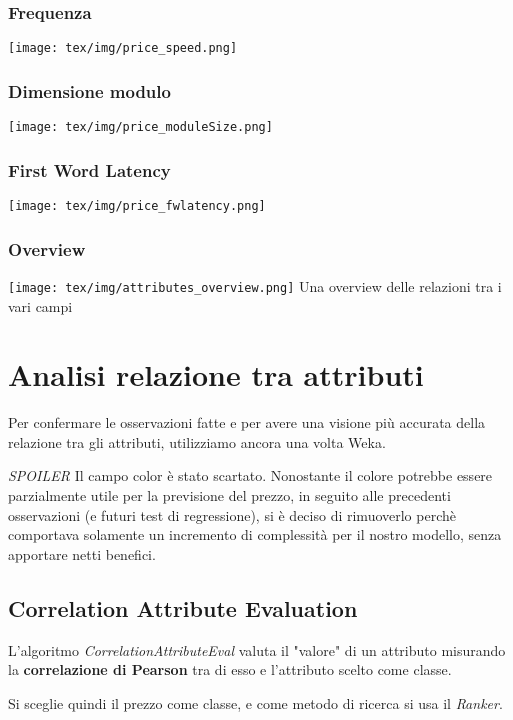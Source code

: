 \documentclass[12pt]{report}
\begin{document}
\subsubsection{Frequenza}
\texttt{[image: tex/img/price\_speed.png]}
\subsubsection{Dimensione modulo}
\texttt{[image: tex/img/price\_moduleSize.png]}
\subsubsection{First Word Latency}
\texttt{[image: tex/img/price\_fwlatency.png]}
\subsubsection{Overview}
\texttt{[image: tex/img/attributes\_overview.png]}
Una overview delle relazioni tra i vari campi


\newpage
\section{Analisi relazione tra attributi}

Per confermare le osservazioni fatte e per avere una visione più accurata della relazione tra
gli attributi, utilizziamo ancora una volta Weka.

\textit{SPOILER} Il campo color è stato scartato. Nonostante il colore potrebbe essere parzialmente
utile per la previsione del prezzo, in seguito alle precedenti osservazioni (e futuri test di
regressione), si è deciso di rimuoverlo perchè comportava solamente un incremento di complessità per
il nostro modello, senza apportare netti benefici.

\subsection{Correlation Attribute Evaluation}
L'algoritmo \textit{CorrelationAttributeEval} valuta il "valore" di un attributo misurando la
\textbf{correlazione di Pearson} tra di esso e l'attributo scelto come classe.

Si sceglie quindi il prezzo come classe, e come metodo di ricerca si usa il \textit{Ranker}.
\end{document}
